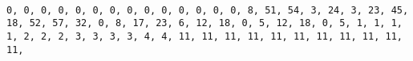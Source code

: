 \documentclass[]{article}
\begin{document}
\begin{verbatim}
                                                                                                                                                                                                                                                                                                                                                                                                                                                                                                                                                                                                                                                                                                                                                                                                                                                                                                                                                                                                                                                                                                                                                                                                                                                                                                                                                                                                                                                                                                                                                                                                                                                                                                                                                                                                                                                                                                                                                                                                                                                                                                                                                                                                                                                                                                                                                                                                                                                                                                                                                                                                                                                                                                                                                                                                                                                                                                                                                                                                                                                                                                                                                                                                                               0, 0, 0, 0, 0, 0, 0, 0, 0, 0, 0, 0, 0, 0, 8, 51, 54, 3, 24, 3, 23, 45, 18, 52, 57, 32, 0, 8, 17, 23, 6, 12, 18, 0, 5, 12, 18, 0, 5, 1, 1, 1, 1, 2, 2, 2, 3, 3, 3, 3, 4, 4, 11, 11, 11, 11, 11, 11, 11, 11, 11, 11, 11, 
\end{verbatim}
\end{document}
